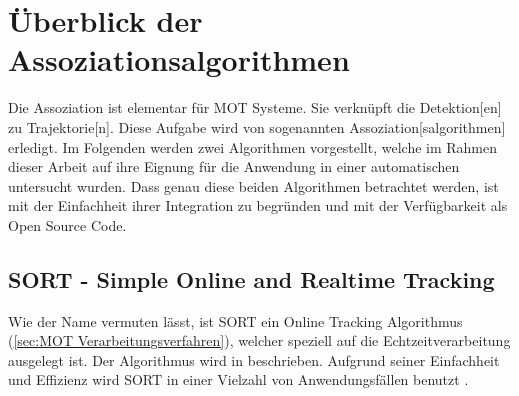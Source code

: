\section{Überblick der Assoziationsalgorithmen} \label{sec:Überblick Tracker}




Die \gls{Assoziation} ist elementar für \gls{MOT} Systeme. Sie verknüpft die \gls{Detektion}[en] zu \gls{Trajektorie}[n]. Diese Aufgabe wird von sogenannten \gls{Assoziation}[salgorithmen] erledigt. Im Folgenden werden zwei Algorithmen vorgestellt, welche im Rahmen dieser Arbeit auf ihre Eignung für die Anwendung in einer automatischen  untersucht wurden. Dass genau diese beiden Algorithmen betrachtet werden, ist mit der Einfachheit ihrer Integration zu begründen und mit der Verfügbarkeit als Open Source Code. 


\subsection{SORT - Simple Online and Realtime Tracking} \label{sec:MOT SORT}

Wie der Name vermuten lässt, ist \acrshort{SORT} ein \gls{Online Tracking} Algorithmus (\autoref{sec:MOT Verarbeitungsverfahren}), welcher speziell auf die Echtzeitverarbeitung ausgelegt ist. Der Algorithmus wird in \cite{Bewley.2016} beschrieben. Aufgrund seiner Einfachheit und Effizienz wird \acrshort{SORT} in einer Vielzahl von Anwendungsfällen benutzt \cite{Chen.2023, Maher.2018, Fedorov.2019}. \par

